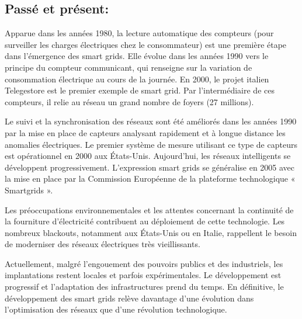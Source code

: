 \subsection{Passé et présent:}

Apparue dans les années 1980, la lecture automatique des compteurs (pour surveiller les charges électriques chez le consommateur) est une première étape dans l’émergence des smart grids.
Elle évolue dans les années 1990 vers le principe du compteur communicant, qui renseigne sur la variation de consommation électrique au cours de la journée. En 2000, le projet italien Telegestore est le premier exemple de smart grid. Par l’intermédiaire de ces compteurs, il relie au réseau un grand nombre de foyers (27 millions).

Le suivi et la synchronisation des réseaux sont été améliorés dans les années 1990 par la mise en place de capteurs analysant rapidement et à longue distance les anomalies électriques. Le premier système de mesure utilisant ce type de capteurs est opérationnel en 2000 aux États-Unis.
Aujourd’hui, les réseaux intelligents se développent progressivement. L’expression smart grids se généralise en 2005 avec la mise en place par la Commission Européenne de la plateforme technologique « Smartgrids ».

Les préoccupations environnementales et les attentes concernant la continuité de la fourniture d’électricité contribuent au déploiement de cette technologie. Les nombreux blackouts, notamment aux États-Unis ou en Italie, rappellent le besoin de moderniser des réseaux électriques très vieillissants.

Actuellement, malgré l’engouement des pouvoirs publics et des industriels, les implantations restent locales et parfois expérimentales. Le développement est progressif et l’adaptation des infrastructures prend du temps. En définitive, le développement des smart grids relève davantage d’une évolution dans l’optimisation des réseaux que d’une révolution technologique.